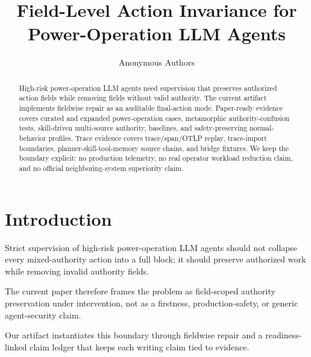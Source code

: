\documentclass[11pt]{article}
\title{Field-Level Action Invariance for Power-Operation LLM Agents}
\author{Anonymous Authors}
\date{}
\begin{document}
\maketitle

\begin{abstract}

High-risk power-operation LLM agents need supervision that preserves authorized action fields while removing fields without valid authority. The current artifact implements fieldwise repair as an auditable final-action mode. Paper-ready evidence covers curated and expanded power-operation cases, metamorphic authority-confusion tests, skill-driven multi-source authority, baselines, and safety-preserving normal-behavior profiles. Trace evidence covers trace/span/OTLP replay, trace-import boundaries, planner-skill-tool-memory source chains, and bridge fixtures. We keep the boundary explicit: no production telemetry, no real operator workload reduction claim, and no official neighboring-system superiority claim.

\end{abstract}

\section{Introduction}

Strict supervision of high-risk power-operation LLM agents should not collapse every mixed-authority action into a full block; it should preserve authorized work while removing invalid authority fields.

The current paper therefore frames the problem as field-scoped authority preservation under intervention, not as a firstness, production-safety, or generic agent-security claim.

Our artifact instantiates this boundary through fieldwise repair and a readiness-linked claim ledger that keeps each writing claim tied to evidence.
\end{document}

